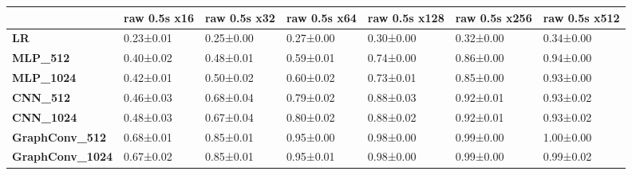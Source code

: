 \begin{tabular}{lllllll}
\toprule
{} & raw 0.5s x16 & raw 0.5s x32 & raw 0.5s x64 & raw 0.5s x128 & raw 0.5s x256 & raw 0.5s x512 \\
\midrule
\textbf{LR            } &    0.23±0.01 &    0.25±0.00 &    0.27±0.00 &     0.30±0.00 &     0.32±0.00 &     0.34±0.00 \\
\textbf{MLP\_512       } &    0.40±0.02 &    0.48±0.01 &    0.59±0.01 &     0.74±0.00 &     0.86±0.00 &     0.94±0.00 \\
\textbf{MLP\_1024      } &    0.42±0.01 &    0.50±0.02 &    0.60±0.02 &     0.73±0.01 &     0.85±0.00 &     0.93±0.00 \\
\textbf{CNN\_512       } &    0.46±0.03 &    0.68±0.04 &    0.79±0.02 &     0.88±0.03 &     0.92±0.01 &     0.93±0.02 \\
\textbf{CNN\_1024      } &    0.48±0.03 &    0.67±0.04 &    0.80±0.02 &     0.88±0.02 &     0.92±0.01 &     0.93±0.02 \\
\textbf{GraphConv\_512 } &    0.68±0.01 &    0.85±0.01 &    0.95±0.00 &     0.98±0.00 &     0.99±0.00 &     1.00±0.00 \\
\textbf{GraphConv\_1024} &    0.67±0.02 &    0.85±0.01 &    0.95±0.01 &     0.98±0.00 &     0.99±0.00 &     0.99±0.02 \\
\bottomrule
\end{tabular}
